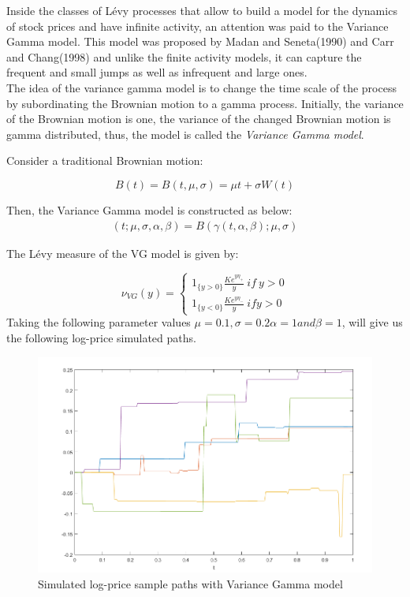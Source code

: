 \documentclass[12pt]{report}
\begin{document}
Inside the classes of Lévy processes that allow to build a model for the dynamics of stock prices and have infinite activity, an attention was paid to the Variance Gamma model. This model was proposed by Madan and Seneta(1990) and Carr and Chang(1998)  and unlike the finite activity models, it can capture the frequent and small jumps as well as infrequent and large ones.\\

The idea of the variance gamma model is to change the time scale of the process by subordinating the Brownian motion to a gamma process. Initially, the variance of the Brownian motion is one, the variance of the changed Brownian motion is gamma distributed, thus, the model is called the \textit{ Variance Gamma  model}. \\   

Consider a traditional Brownian motion:

\[B(t)=B(t,\mu,\sigma)=\mu t +\sigma W(t)\] 

Then, the Variance Gamma model is constructed as below: 
\begin{gather}
 (t; \mu,\sigma,\alpha,\beta)=B(\gamma(t,\alpha,\beta);\mu,\sigma) 
\end{gather}


The Lévy measure of the VG model is given by:

 \[\nu_{VG}(y)= \begin{cases} 
  1_{\{y > 0\}} \frac{K e^{y \eta_+}}{y}~ if ~y >0 \\
     1_{\{y < 0\}} \frac{K e^{y \eta_-}}{y}~ if y >0 
         \end{cases}
          \]
Taking the following parameter values $\mu= 0.1,\sigma=0.2 \alpha=1 and \beta=1   $, will give us the following log-price simulated paths.
\begin{figure}[h]

\centering
\includegraphics[scale=0.7]{VG.png} 
\caption{Simulated log-price sample paths with Variance Gamma model }
\end{figure}
\end{document}
